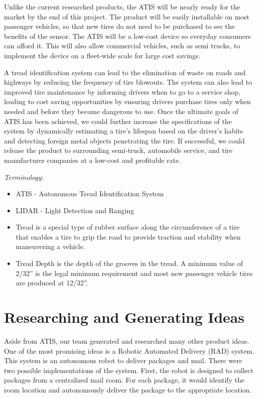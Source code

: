 \documentclass[11pt]{IEEEtran}
\begin{document}
			Unlike the current researched products, the ATIS will be nearly ready for the market by the end of this project. The product will be easily installable on most passenger vehicles, so that new tires do not need to be purchased to see the benefits of the sensor. The ATIS will be a low-cost device so everyday consumers can afford it. This will also allow commercial vehicles, such as semi trucks, to implement the device on a fleet-wide scale for large cost savings. 

			A tread identification system can lead to the elimination of waste on roads and highways by reducing the frequency of tire blowouts. The system can also lead to improved tire maintenance by informing drivers when to go to a service shop, leading to cost saving opportunities by ensuring drivers purchase tires only when needed and before they become dangerous to use. Once the ultimate goals of ATIS has been achieved, we could further increase the specifications of the system by dynamically estimating a tire’s lifespan based on the driver’s habits and detecting foreign metal objects penetrating the tire. If successful, we could release the product to surrounding semi-truck, automobile service, and tire manufacturer companies at a low-cost and profitable rate.

		\textit{Terminology}:
		\begin{itemize}
			\item ATIS - Autonomous Tread Identification System
			\item LIDAR - Light Detection and Ranging 
			\item Tread is a special type of rubber surface along the circumference of a tire that enables a tire to grip the road to provide traction and stability when maneuvering a vehicle.
			\item Tread Depth is the depth of the grooves in the tread. A minimum value of 2/32'' is the legal minimum requirement and most new passenger vehicle tires are produced at 12/32''.
		\end{itemize}

	\section{Researching and Generating Ideas}
		Aside from ATIS, our team generated and researched many other product ideas. One of the most promising ideas is a Robotic Automated Delivery (RAD) system. This system is an autonomous robot to deliver packages and mail. There were two possible implementations of the system. First, the robot is designed to collect packages from a centralized mail room. For each package, it would identify the room location and autonomously deliver the package to the appropriate location. 
\end{document}
